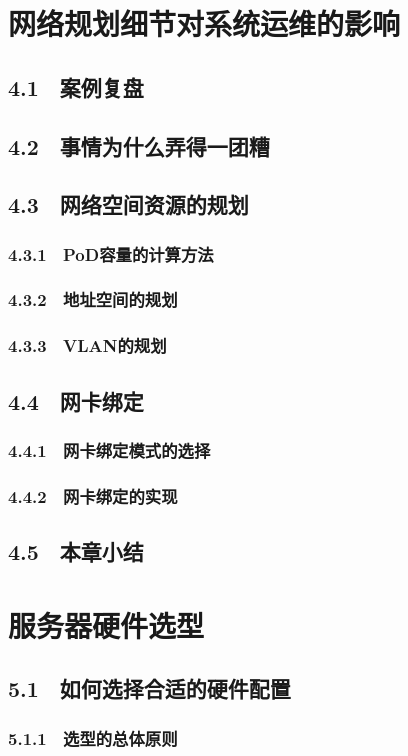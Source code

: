 \documentclass[12pt,UTF8]{ctexbook}
\begin{document}
\chapter{网络规划细节对系统运维的影响}
\section{4.1　案例复盘}
\section{4.2　事情为什么弄得一团糟}
\section{4.3　网络空间资源的规划}
\subsection{4.3.1　PoD容量的计算方法}
\subsection{4.3.2　地址空间的规划}
\subsection{4.3.3　VLAN的规划}
\section{4.4　网卡绑定}
\subsection{4.4.1　网卡绑定模式的选择}
\subsection{4.4.2　网卡绑定的实现}
\section{4.5　本章小结}
\chapter{服务器硬件选型}
\section{5.1　如何选择合适的硬件配置}
\subsection{5.1.1　选型的总体原则}
\end{document}
